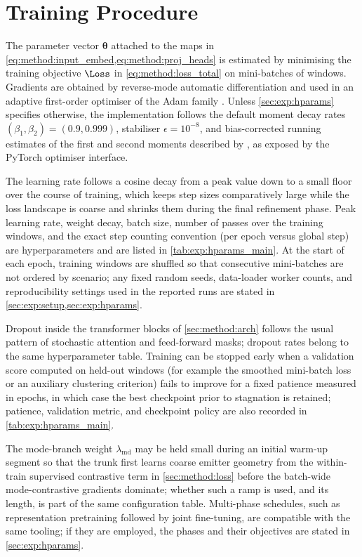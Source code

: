 \section{Training Procedure}\label{sec:method:training}

The parameter vector $\bm{\theta}$ attached to the maps in \cref{eq:method:input_embed,eq:method:proj_heads} is estimated by minimising the training objective $\Loss$ in \cref{eq:method:loss_total} on mini-batches of windows.
Gradients are obtained by reverse-mode automatic differentiation and used in an adaptive first-order optimiser of the Adam family \parencite{kingma2014adam}.
Unless \cref{sec:exp:hparams} specifies otherwise, the implementation follows the default moment decay rates $(\beta_1,\beta_2) = (0.9,0.999)$, stabiliser $\epsilon = 10^{-8}$, and bias-corrected running estimates of the first and second moments described by \textcite{kingma2014adam}, as exposed by the PyTorch optimiser interface.

The learning rate follows a cosine decay from a peak value down to a small floor over the course of training, which keeps step sizes comparatively large while the loss landscape is coarse and shrinks them during the final refinement phase.
Peak learning rate, weight decay, batch size, number of passes over the training windows, and the exact step counting convention (per epoch versus global step) are hyperparameters and are listed in \cref{tab:exp:hparams_main}.
At the start of each epoch, training windows are shuffled so that consecutive mini-batches are not ordered by scenario; any fixed random seeds, data-loader worker counts, and reproducibility settings used in the reported runs are stated in \cref{sec:exp:setup,sec:exp:hparams}.

Dropout inside the transformer blocks of \cref{sec:method:arch} follows the usual pattern of stochastic attention and feed-forward masks; dropout rates belong to the same hyperparameter table.
Training can be stopped early when a validation score computed on held-out windows (for example the smoothed mini-batch loss or an auxiliary clustering criterion) fails to improve for a fixed patience measured in epochs, in which case the best checkpoint prior to stagnation is retained; patience, validation metric, and checkpoint policy are also recorded in \cref{tab:exp:hparams_main}.

The mode-branch weight $\lambda_{\mathrm{md}}$ may be held small during an initial warm-up segment so that the trunk first learns coarse emitter geometry from the within-train supervised contrastive term in \cref{sec:method:loss} before the batch-wide mode-contrastive gradients dominate; whether such a ramp is used, and its length, is part of the same configuration table.
Multi-phase schedules, such as representation pretraining followed by joint fine-tuning, are compatible with the same tooling; if they are employed, the phases and their objectives are stated in \cref{sec:exp:hparams}.
